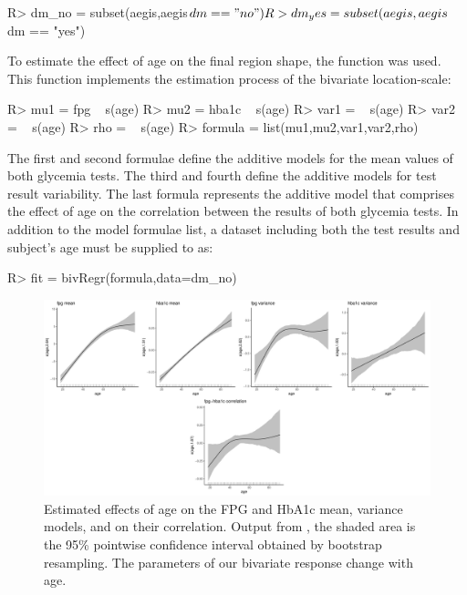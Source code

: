 \begin{example}
R> dm_no = subset(aegis,aegis$dm == "no")
R> dm_yes = subset(aegis,aegis$dm == "yes")
\end{example}

To estimate the effect of age on the final region shape, the  function was used. This function implements the estimation process of the bivariate location-scale:

\begin{example}
R> mu1 = fpg ~ s(age)
R> mu2 = hba1c ~ s(age)
R> var1 = ~ s(age)
R> var2 = ~ s(age)
R> rho = ~ s(age)
R> formula = list(mu1,mu2,var1,var2,rho)
\end{example}

The first and second formulae define the additive models for the mean values of both glycemia tests. The third and fourth define the additive models for test result variability. The last formula represents the additive model that comprises the effect of age on the correlation between the results of both glycemia tests. In addition to the model formulae list, a dataset including both the test results and subject's age must be supplied to  as:


\begin{example}
R> fit = bivRegr(formula,data=dm_no)
\end{example}

\begin{figure}[!htb]
	\centering
	\includegraphics[width = \textwidth]{Fig2.pdf}
	\caption{Estimated effects of age on the FPG and HbA1c mean, variance models, and on their correlation. Output from , the shaded area is the 95\% pointwise confidence interval obtained by bootstrap resampling. The parameters of our bivariate response change with age.} 
	\label{effects}
\end{figure}


